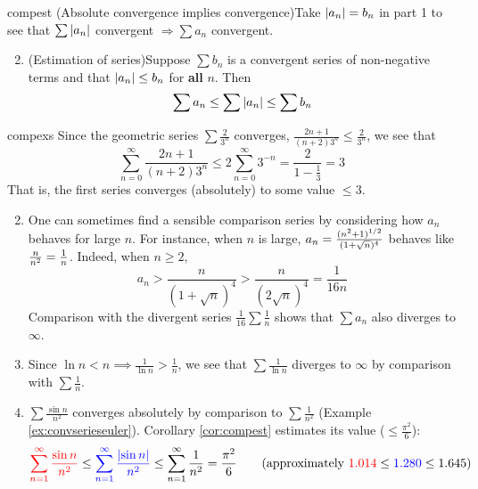 \begin{cor}{}{compest}
	\exstart (Absolute convergence implies convergence)\quad Take $\left| a_n\right|=b_n$ in part 1 to see that $\sum\left| a_n\right|$ convergent $\Longrightarrow\sum a_n$ convergent.
	\begin{enumerate}\setcounter{enumi}{1}
	  \item (Estimation of series)\quad Suppose $\sum b_n$ is a convergent series of non-negative terms and that $\left| a_n\right|\le b_n$ for \textbf{all} $n$. Then
	  \[
	  	\sum a_n\le \sum\left| a_n\right|\le \sum b_n
	  \]
	\end{enumerate}
\end{cor}

\goodbreak


\begin{examples}{}{compexs}
	\exstart Since the geometric series $\sum \frac 2{3^n}$ converges, $\frac{2n+1}{(n+2)3^n}\le \frac 2{3^n}$, we see that%
	\[
		\sum_{n=0}^\infty\frac{2n+1}{(n+2)3^n}
		\le 2\sum_{n=0}^\infty 3^{-n}
		=\frac 2{1-\frac 13}=3
	\]
	That is, the first series converges (absolutely) to some value $\le 3$.
	
	\begin{enumerate}\setcounter{enumi}{1}
	  \item One can sometimes find a sensible comparison series by considering how $a_n$ behaves for large $n$. For instance, when $n$ is large, $a_n=\smash[b]{\frac{(n^2+1)^{1/2}}{(1+\sqrt n)^4}}$ behaves like $\smash[b]{\frac{n}{n^2}=\frac 1{n}}$. Indeed, when $n\ge 2$,
	  \[
	  	a_n>\frac n{(1+\sqrt n)^4}>\frac n{(2\sqrt n)^4}=\frac 1{16n}
	  \]
	  Comparison with the divergent series $\frac 1{16}\sum \frac 1n$ shows that $\sum a_n$ also diverges to $\infty$.
	  
		\item Since $\ln n<n\implies\frac 1{\ln n}>\frac 1n$, we see that $\sum \frac 1{\ln n}$ diverges to $\infty$ by comparison with $\sum\frac 1n$.
		
	  \item $\sum\frac{\sin n}{n^2}$ converges absolutely by comparison to $\sum\frac 1{n^2}$ (Example \ref{ex:convserieseuler}). Corollary \ref{cor:compest} estimates its value ($\le \frac{\pi^2}6$):
		\begin{gather*}
			\textcolor{red}{\sum_{n=1}^\infty\frac{\sin n}{n^2}} 
			\le \textcolor{blue}{\sum_{n=1}^\infty \frac{\nm{\sin n}}{n^2}} 
			\le \sum_{n=1}^\infty\frac 1{n^2} 
			=\frac{\pi^2}6 
			\tag{approximately $\textcolor{red}{1.014}\le \textcolor{blue}{1.280} \le 1.645$}
		\end{gather*}
		

\end{enumerate}
\end{examples}
